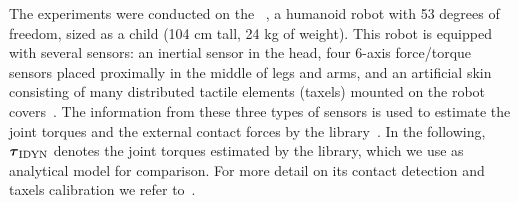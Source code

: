 	The experiments were conducted on the \robot{}~\cite{Natale2013}, a humanoid robot with 53 degrees of freedom, sized as a child (104 cm tall, 24 kg of weight).
	This robot is equipped with several sensors: an inertial sensor in the head, four 6-axis force/torque sensors placed proximally in the middle of legs and arms, and an artificial skin consisting of many distributed tactile elements (taxels) mounted on the robot covers~\cite{Cannata2008}. 
	The information from these three types of sensors is used to estimate the joint torques and the external contact forces by the \idyn{}  library~\cite{Ivaldi2011}. 
	In the following, $\boldsymbol{\tau}_{\rm IDYN}$ denotes the joint torques estimated by the \idyn{} library, which we use as analytical model for comparison. 
	For more detail on its contact detection and taxels calibration we refer to~\cite{DelPrete2011,DelPrete2012}.


